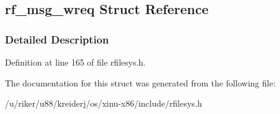 \hypertarget{structrf__msg__wreq}{}\subsection{rf\+\_\+msg\+\_\+wreq Struct Reference}
\label{structrf__msg__wreq}


\subsubsection{Detailed Description}


Definition at line 165 of file rfilesys.\+h.



The documentation for this struct was generated from the following file\+:\begin{DoxyCompactItemize}
\item 
/u/riker/u88/kreiderj/os/xinu-\/x86/include/rfilesys.\+h\end{DoxyCompactItemize}
